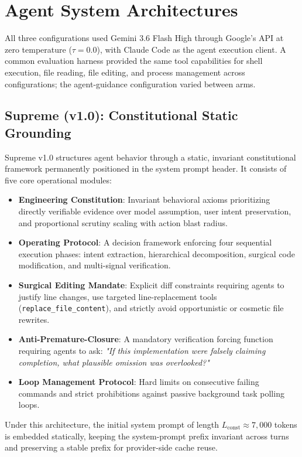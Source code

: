 \section{Agent System Architectures}
\label{sec:architectures}

All three configurations used Gemini 3.6 Flash High through Google's API at zero temperature ($\tau=0.0$), with Claude Code as the agent execution client. A common evaluation harness provided the same tool capabilities for shell execution, file reading, file editing, and process management across configurations; the agent-guidance configuration varied between arms.

\subsection{Supreme (v1.0): Constitutional Static Grounding}
Supreme v1.0 structures agent behavior through a static, invariant constitutional framework permanently positioned in the system prompt header. It consists of five core operational modules:
\begin{itemize}
    \item \textbf{Engineering Constitution}: Invariant behavioral axioms prioritizing directly verifiable evidence over model assumption, user intent preservation, and proportional scrutiny scaling with action blast radius.
    \item \textbf{Operating Protocol}: A decision framework enforcing four sequential execution phases: intent extraction, hierarchical decomposition, surgical code modification, and multi-signal verification.
    \item \textbf{Surgical Editing Mandate}: Explicit diff constraints requiring agents to justify line changes, use targeted line-replacement tools (\texttt{replace\_file\_content}), and strictly avoid opportunistic or cosmetic file rewrites.
    \item \textbf{Anti-Premature-Closure}: A mandatory verification forcing function requiring agents to ask: \textit{"If this implementation were falsely claiming completion, what plausible omission was overlooked?"}
    \item \textbf{Loop Management Protocol}: Hard limits on consecutive failing commands and strict prohibitions against passive background task polling loops.
\end{itemize}
Under this architecture, the initial system prompt of length $L_{\text{const}} \approx 7,000$ tokens is embedded statically, keeping the system-prompt prefix invariant across turns and preserving a stable prefix for provider-side cache reuse.

